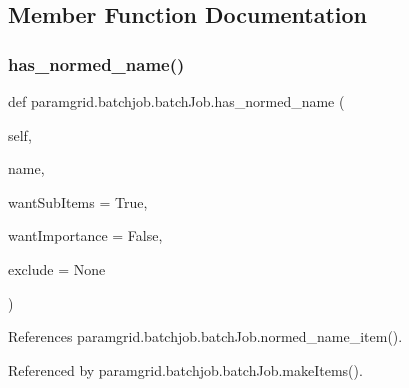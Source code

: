 \subsection{Member Function Documentation}
\mbox{\label{classparamgrid_1_1batchjob_1_1batchJob_a6110e6b6926e033a773d799e35e1ba68}} 
\subsubsection{\texorpdfstring{has\+\_\+normed\+\_\+name()}{has\_normed\_name()}}
{\footnotesize\ttfamily def paramgrid.\+batchjob.\+batch\+Job.\+has\+\_\+normed\+\_\+name (\begin{DoxyParamCaption}\item[{}]{self,  }\item[{}]{name,  }\item[{}]{want\+Sub\+Items = {\ttfamily True},  }\item[{}]{want\+Importance = {\ttfamily False},  }\item[{}]{exclude = {\ttfamily None} }\end{DoxyParamCaption})}



References paramgrid.\+batchjob.\+batch\+Job.\+normed\+\_\+name\+\_\+item().



Referenced by paramgrid.\+batchjob.\+batch\+Job.\+make\+Items().

